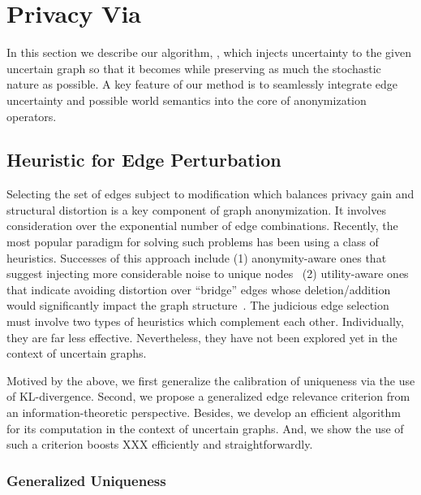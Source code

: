 \section{Privacy Via {\methodName}}
In this section we describe our algorithm, {\methodName}, which injects uncertainty to the given uncertain graph so that it becomes {\keobf} while preserving as much the stochastic nature as possible. A key feature of our method is to seamlessly integrate edge uncertainty and possible world semantics into the core of anonymization operators. 
% 
\subsection{Heuristic for Edge Perturbation}

Selecting the set of edges subject to modification which balances privacy gain and structural distortion is 
a key component of graph anonymization. 
It involves consideration over the exponential number of edge combinations. 
Recently, the most popular paradigm for solving such problems has been using a class of heuristics. 
Successes of this approach include
(1) anonymity-aware ones that suggest injecting more considerable noise to unique nodes~\cite{Ying2009,Boldi_Injecting_2012,Hay_Anonymizing_2007} 
(2) utility-aware ones that indicate avoiding distortion over “bridge” edges whose deletion/addition would significantly impact the graph structure~\cite{Wang2011,Ninggal_Utility_2015}. 
The judicious edge selection must involve two types of heuristics which complement each other. 
Individually, they are far less effective. 
Nevertheless, they have not been explored yet in the context of uncertain graphs.

Motived by the above, we first generalize the calibration of uniqueness via the use of KL-divergence. 
Second, we propose a generalized edge relevance criterion from an information-theoretic perspective.
Besides, we develop an efficient algorithm for its computation in the context of uncertain graphs.
And, we show the use of such a criterion boosts XXX efficiently and straightforwardly.

\subsubsection{Generalized Uniqueness}

